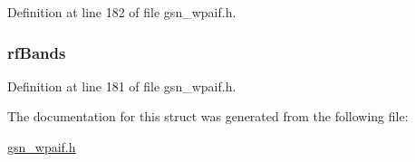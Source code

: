 Definition at line 182 of file gsn\_\-wpaif.h.

\hypertarget{a00427_acff317d8487a8aeadf1b0c29f6ac5099}{
\subsubsection[{rfBands}]{ {\bf rfBands}}}
\label{a00427_acff317d8487a8aeadf1b0c29f6ac5099}


Definition at line 181 of file gsn\_\-wpaif.h.



The documentation for this struct was generated from the following file:\begin{DoxyCompactItemize}
\item 
\hyperlink{a00615}{gsn\_\-wpaif.h}\end{DoxyCompactItemize}
